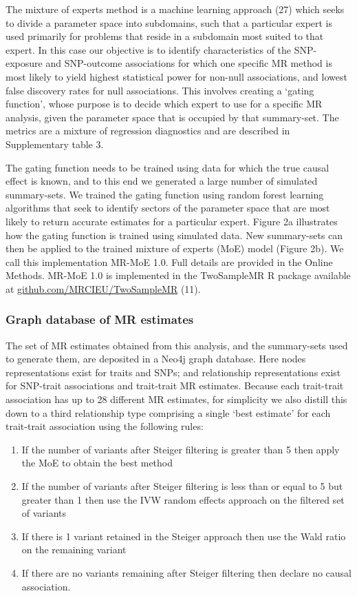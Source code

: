 \documentclass[]{article}
\providecommand{\tightlist}{%
  \setlength{\itemsep}{0pt}\setlength{\parskip}{0pt}}
\begin{document}
The mixture of experts method is a machine learning approach (27) which
seeks to divide a parameter space into subdomains, such that a
particular expert is used primarily for problems that reside in a
subdomain most suited to that expert. In this case our objective is to
identify characteristics of the SNP-exposure and SNP-outcome
associations for which one specific MR method is most likely to yield
highest statistical power for non-null associations, and lowest false
discovery rates for null associations. This involves creating a `gating
function', whose purpose is to decide which expert to use for a specific
MR analysis, given the parameter space that is occupied by that
summary-set. The metrics are a mixture of regression diagnostics and are
described in Supplementary table 3.

The gating function needs to be trained using data for which the true
causal effect is known, and to this end we generated a large number of
simulated summary-sets. We trained the gating function using random
forest learning algorithms that seek to identify sectors of the
parameter space that are most likely to return accurate estimates for a
particular expert. Figure 2a illustrates how the gating function is
trained using simulated data. New summary-sets can then be applied to
the trained mixture of experts (MoE) model (Figure 2b). We call this
implementation MR-MoE 1.0. Full details are provided in the Online
Methods. MR-MoE 1.0 is implemented in the TwoSampleMR R package
available at
\href{https://github.com/MRCIEU/TwoSampleMR}{github.com/MRCIEU/TwoSampleMR}
(11).

\subsubsection{Graph database of MR
estimates}\label{graph-database-of-mr-estimates}

The set of MR estimates obtained from this analysis, and the
summary-sets used to generate them, are deposited in a Neo4j graph
database. Here nodes representations exist for traits and SNPs; and
relationship representations exist for SNP-trait associations and
trait-trait MR estimates. Because each trait-trait association has up to
28 different MR estimates, for simplicity we also distill this down to a
third relationship type comprising a single `best estimate' for each
trait-trait association using the following rules:

\begin{enumerate}
\def\labelenumi{\arabic{enumi}.}
\tightlist
\item
  If the number of variants after Steiger filtering is greater than 5
  then apply the MoE to obtain the best method
\item
  If the number of variants after Steiger filtering is less than or
  equal to 5 but greater than 1 then use the IVW random effects approach
  on the filtered set of variants
\item
  If there is 1 variant retained in the Steiger approach then use the
  Wald ratio on the remaining variant
\item
  If there are no variants remaining after Steiger filtering then
  declare no causal association.
\end{enumerate}
\end{document}

